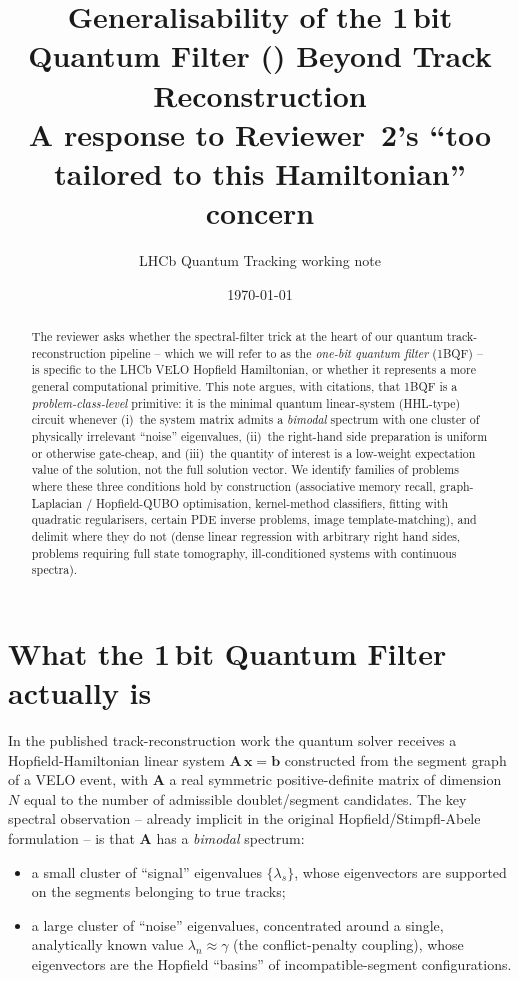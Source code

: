 \documentclass[11pt,a4paper]{article}
\title{Generalisability of the 1\,bit Quantum Filter (\OBQF{}) Beyond Track Reconstruction\\[2pt]
\large A response to Reviewer~2's ``too tailored to this Hamiltonian'' concern}
\author{LHCb Quantum Tracking working note}
\date{\today}
\newcommand{\OBQF}{\textsc{1BQF}}
\begin{document}
\maketitle

\begin{abstract}
\noindent
The reviewer asks whether the spectral-filter trick at the heart of our quantum
track-reconstruction pipeline -- which we will refer to as the
\emph{one-bit quantum filter} (\OBQF{}) -- is specific to the LHCb VELO
Hopfield Hamiltonian, or whether it represents a more general computational
primitive.  This note argues, with citations, that \OBQF{} is a
\emph{problem-class-level} primitive: it is the minimal quantum
linear-system (HHL-type) circuit whenever (i)~the system matrix admits a
\emph{bimodal} spectrum with one cluster of physically irrelevant
``noise'' eigenvalues, (ii)~the right-hand side preparation is uniform or
otherwise gate-cheap, and (iii)~the quantity of interest is a low-weight
expectation value of the solution, not the full solution vector.  We
identify families of problems where these three conditions hold by
construction (associative memory recall, graph-Laplacian / Hopfield-QUBO
optimisation, kernel-method classifiers, fitting with quadratic
regularisers, certain PDE inverse problems, image template-matching), and
delimit where they do not (dense linear regression with arbitrary right
hand sides, problems requiring full state tomography, ill-conditioned
systems with continuous spectra).
\end{abstract}

\section{What the 1\,bit Quantum Filter actually is}
\label{sec:definition}

In the published track-reconstruction work the quantum solver receives a
Hopfield-Hamiltonian linear system $\mathbf{A}\,\mathbf{x} = \mathbf{b}$
constructed from the segment graph of a VELO event, with $\mathbf{A}$ a
real symmetric positive-definite matrix of dimension $N$ equal to the
number of admissible doublet/segment candidates.  The key spectral
observation -- already implicit in the original Hopfield/Stimpfl-Abele
formulation \cite{Hopfield:1982,StimpflAbele:1991,Denby:1988} -- is that
$\mathbf{A}$ has a \emph{bimodal} spectrum:
\begin{itemize}[leftmargin=1.2em,topsep=2pt,itemsep=2pt]
  \item a small cluster of ``signal'' eigenvalues
        $\{\lambda_s\}$, whose eigenvectors are supported on the segments
        belonging to true tracks;
  \item a large cluster of ``noise'' eigenvalues, concentrated around
        a single, analytically known value $\lambda_n \approx \gamma$
        (the conflict-penalty coupling), whose eigenvectors are the
        Hopfield ``basins'' of incompatible-segment configurations.
\end{itemize}
\end{document}
